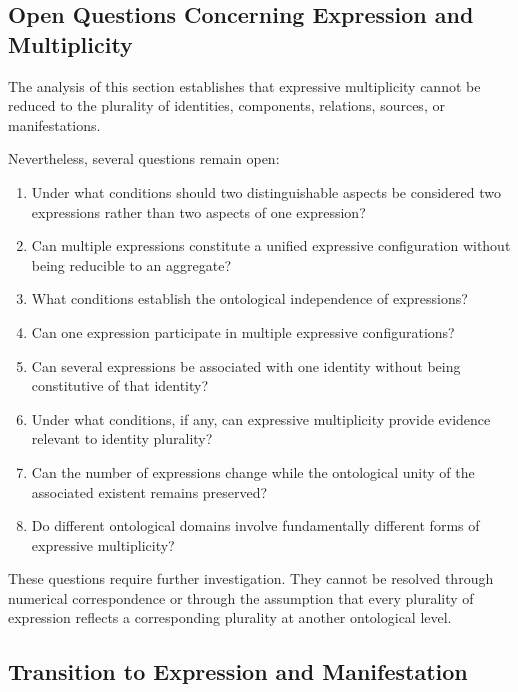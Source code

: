 \subsection{Open Questions Concerning Expression and Multiplicity}

The analysis of this section establishes
that expressive multiplicity cannot be
reduced to the plurality of identities,
components, relations, sources, or manifestations.

Nevertheless, several questions remain open:

\begin{enumerate}
    \item Under what conditions should two
    distinguishable aspects be considered
    two expressions rather than two aspects
    of one expression?

    \item Can multiple expressions constitute
    a unified expressive configuration without
    being reducible to an aggregate?

    \item What conditions establish the
    ontological independence of expressions?

    \item Can one expression participate
    in multiple expressive configurations?

    \item Can several expressions be associated
    with one identity without being
    constitutive of that identity?

    \item Under what conditions, if any,
    can expressive multiplicity provide
    evidence relevant to identity plurality?

    \item Can the number of expressions change
    while the ontological unity of the
    associated existent remains preserved?

    \item Do different ontological domains
    involve fundamentally different forms
    of expressive multiplicity?
\end{enumerate}

These questions require further investigation.
They cannot be resolved through numerical
correspondence or through the assumption
that every plurality of expression reflects
a corresponding plurality at another
ontological level.

\subsection{Transition to Expression and Manifestation}

